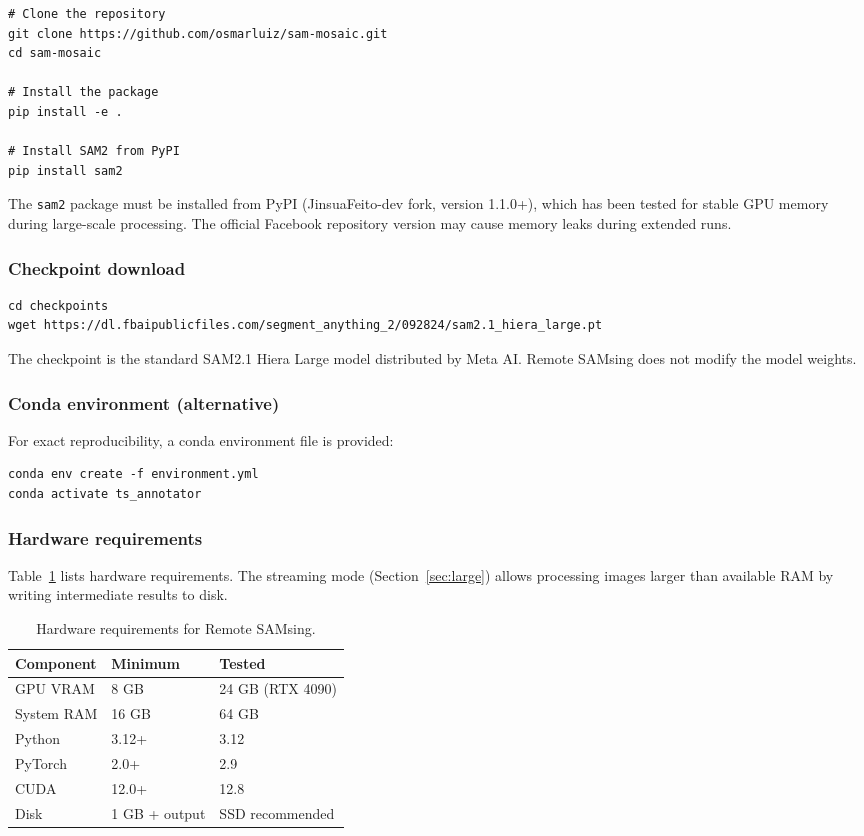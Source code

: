 \documentclass[review,11pt,authoryear]{elsarticle}
\begin{document}
\begin{lstlisting}[style=bash]
# Clone the repository
git clone https://github.com/osmarluiz/sam-mosaic.git
cd sam-mosaic

# Install the package
pip install -e .

# Install SAM2 from PyPI
pip install sam2
\end{lstlisting}

\noindent
The \texttt{sam2} package must be installed from PyPI (JinsuaFeito-dev fork, version 1.1.0+), which has been tested for stable GPU memory during large-scale processing. The official Facebook repository version may cause memory leaks during extended runs.

\subsubsection{Checkpoint download}

\begin{lstlisting}[style=bash]
cd checkpoints
wget https://dl.fbaipublicfiles.com/segment_anything_2/092824/sam2.1_hiera_large.pt
\end{lstlisting}

\noindent
The checkpoint is the standard SAM2.1 Hiera Large model distributed by Meta AI. Remote SAMsing does not modify the model weights.

\subsubsection{Conda environment (alternative)}

For exact reproducibility, a conda environment file is provided:

\begin{lstlisting}[style=bash]
conda env create -f environment.yml
conda activate ts_annotator
\end{lstlisting}

\subsubsection{Hardware requirements}

Table~\ref{tab:hardware} lists hardware requirements. The streaming mode (Section~\ref{sec:large}) allows processing images larger than available RAM by writing intermediate results to disk.

\begin{table}[htbp]
\centering
\caption{Hardware requirements for Remote SAMsing.}
\label{tab:hardware}
\begin{tabular}{lll}
\toprule
Component & Minimum & Tested \\
\midrule
GPU VRAM & 8 GB & 24 GB (RTX 4090) \\
System RAM & 16 GB & 64 GB \\
Python & 3.12+ & 3.12 \\
PyTorch & 2.0+ & 2.9 \\
CUDA & 12.0+ & 12.8 \\
Disk & 1 GB + output & SSD recommended \\
\bottomrule
\end{tabular}
\end{table}
\end{document}
